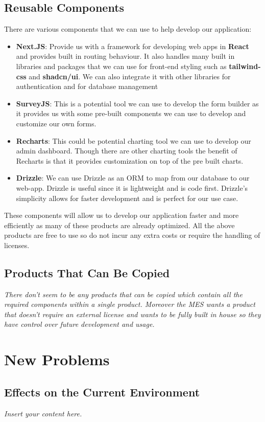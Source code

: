 \documentclass[12pt]{article}
\newcommand{\lips}{\textit{Insert your content here.}}
\begin{document}
\subsection{Reusable Components}
There are various components that we can use to help develop our application:
\begin{itemize}
  \item \textbf{Next.JS}: Provide us with a framework for developing web apps in \textbf{React} and provides built in routing behaviour. It also handles many built in libraries and packages that we can use for front-end styling such as \textbf{tailwind-css} and \textbf{shadcn/ui}. We can also integrate it with other libraries for authentication and for database management
  \item \textbf{SurveyJS}: This is a potential tool we can use to develop the form builder as it provides us with some pre-built components we can use to develop and customize our own forms. 
  \item \textbf{Recharts}: This could be potential charting tool we can use to develop our admin dashboard. Though there are other charting tools the benefit of Recharts is that it provides customization on top of the pre built charts.
  \item \textbf{Drizzle}: We can use Drizzle as an ORM to map from our database to our web-app. Drizzle is useful since it is lightweight and is code first. Drizzle's simplicity allows for faster development and is perfect for our use case.
\end{itemize}
These components will allow us to develop our application faster and more efficiently as many of these products are already optimized. All the above products are free to use so do not incur any extra costs or require the handling of licenses.
\subsection{Products That Can Be Copied}
\textit{There don't seem to be any products that can be copied which contain all the required components within a single product. Moreover the MES wants a product that doesn't require an external license and wants to be fully built in house so they have control over future development and usage.}

\section{New Problems}
\subsection{Effects on the Current Environment}
\lips
\end{document}

